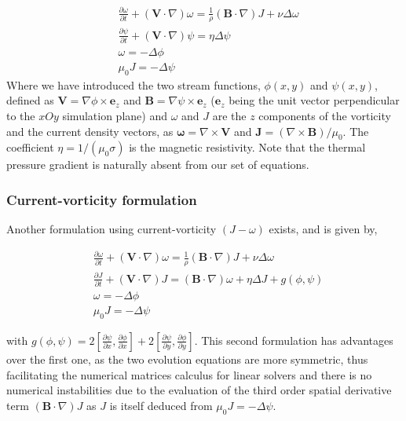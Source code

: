 \documentclass[12pt,openany]{amsbook}
\newcommand{\bbm}[1]{{\mathbf{#1}}}
\begin{document}
\begin{align}
    & \frac{\partial \omega}{\partial t} + (\bbm V \cdot \nabla) \omega  = \frac{1}{\rho} (\bbm B \cdot \nabla)J  + \nu \Delta \omega \\
    & \frac{\partial \psi }{\partial t} + (\bbm V \cdot \nabla)  \psi = \eta \Delta  \psi  \\
    & \omega  = - \Delta \phi \\
    & \mu_0  J  =  - \Delta \psi 
\end{align}
Where we have introduced the two stream functions, $\phi(x, y)$ and $\psi(x, y)$, defined as 
$\bbm V = \nabla \phi \times \bbm e_z$ and $\bbm B = \nabla \psi \times \bbm e_z$
($\bbm e_z$ being the unit vector perpendicular to the $xOy$ simulation plane)
and $\omega$ and $J$ are the $z$ components of the vorticity and 
the current density vectors, as $\bm \omega = \nabla \times \bbm V$ and $\bbm J = (\nabla \times \bbm B) / \mu_0$. 
The coefficient $\eta = 1/(\mu_0 \sigma)$ is the magnetic resistivity.
Note that the thermal pressure gradient is naturally absent from our set of equations.\\

\subsubsection{Current-vorticity formulation}

Another formulation using current-vorticity $(J - \omega)$ exists, and is given by,

\begin{align}
    & \frac{\partial \omega}{\partial t} + (\bbm V \cdot \nabla) \omega  = \frac{1}{\rho} (\bbm B \cdot \nabla)J  + \nu \Delta \omega \\
    & \frac{\partial J }{\partial t} + (\bbm V \cdot \nabla) J = (\bbm B \cdot \nabla)\omega + \eta \Delta  J   + g(\phi,\psi)\\
    & \omega  = - \Delta \phi \\
    & \mu_0  J  =  - \Delta \psi 
\end{align}

with $g(\phi,\psi) = 2[\frac{\partial \psi}{\partial x}, \frac{\partial \phi}{\partial x}] + 
2[\frac{\partial \psi}{\partial y},\frac{\partial \phi}{\partial y}]$. This second formulation has advantages
over the first one, as the two evolution equations are more symmetric, thus facilitating the numerical matrices calculus
for linear solvers and there is no numerical instabilities due to the evaluation of the third order spatial derivative term
$(\bbm B \cdot \nabla)J$ as $J$ is itself deduced from $\mu_0  J  =  - \Delta \psi $.
\end{document}
